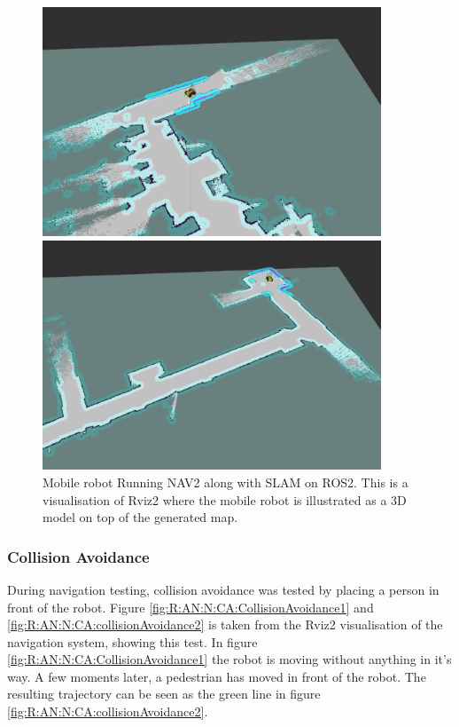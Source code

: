 \begin{figure}[H]
  \centering
  \begin{minipage}[b]{0.49\textwidth}
        \centering
        \includegraphics[width = 0.9\textwidth]{Figures/figNavUia2.png}
  \end{minipage}
  \hfill
  \begin{minipage}[b]{0.49\textwidth}
    \centering
    \includegraphics[width = 0.9\textwidth]{Figures/figNavUia4.png}
  \end{minipage}
  \caption{Mobile robot Running NAV2 along with SLAM on ROS2. This is a visualisation of Rviz2 where the mobile robot is illustrated as a 3D model on top of the generated map.}
  \label{fig:R:H:SLAM:figNavUia}
\end{figure}


\subsubsection{Collision Avoidance}
During navigation testing, collision avoidance was tested by placing a person in front of the robot. Figure \ref{fig:R:AN:N:CA:CollisionAvoidance1} and \ref{fig:R:AN:N:CA:collisionAvoidance2} is taken from the Rviz2 visualisation of the navigation system, showing this test. In figure \ref{fig:R:AN:N:CA:CollisionAvoidance1} the robot is moving without anything in it's way. A few moments later, a pedestrian has moved in front of the robot. The resulting trajectory can be seen as the green line in figure \ref{fig:R:AN:N:CA:collisionAvoidance2}.

